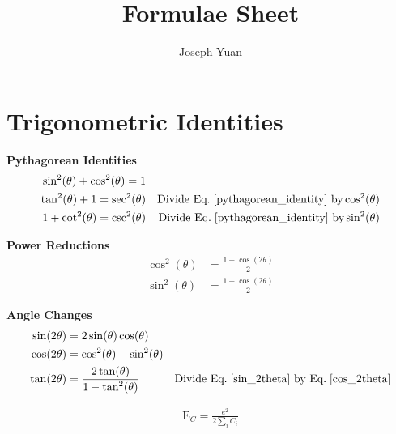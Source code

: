 \documentclass[12pt]{article}
\title{Formulae Sheet}
\author{Joseph Yuan}
\date{}
\newcommand{\eq}[1]{Eq. \!\eqref{#1}}
\begin{document}
\maketitle

\section{Trigonometric Identities}

\textbf{Pythagorean Identities}
\begin{align}
\sin^2(\theta) + \cos^2(\theta) = 1 && \label{pythagorean_identity}\\
\tan^2(\theta) + 1 = \sec^2(\theta) && \text{Divide \eq{pythagorean_identity} by} \cos^2(\theta)\\
1 + \cot^2(\theta) = \csc^2(\theta) && \text{Divide \eq{pythagorean_identity} by} \sin^2(\theta)
\end{align}

\textbf{Power Reductions}
\begin{align}
\cos^2(\theta) &= \frac{1 + \cos(2\theta)}{2} \\
\sin^2(\theta) &= \frac{1 - \cos(2\theta)}{2}
\end{align}

\textbf{Angle Changes}
\begin{align}
\sin(2\theta) &= 2\sin(\theta)\cos(\theta) & \label{sin_2theta}\\
\cos(2\theta) &= \cos^2(\theta) - \sin^2(\theta) & \label{cos_2theta}\\
\tan(2\theta) &= \frac{2\tan(\theta)}{1 - \tan^2(\theta)}  & \text{Divide \eq{sin_2theta} by \eq{cos_2theta}}
\end{align}

\begin{align*}
\text{E}_C = \frac{e^2}{2\sum_iC_i}
\end{align*}
\end{document}
